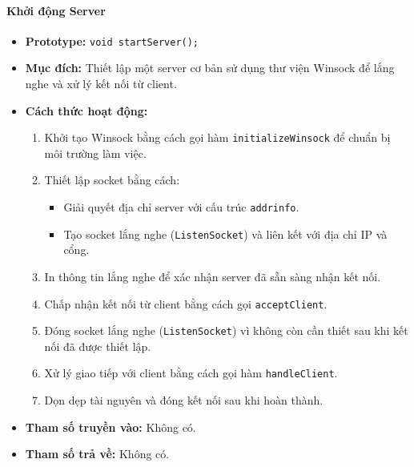 \paragraph{\textbf{Khởi động Server}}
\begin{itemize}
    \item \textbf{Prototype:} \texttt{void startServer();}
    
    \item \textbf{Mục đích:} Thiết lập một server cơ bản sử dụng thư viện Winsock để lắng nghe và xử lý kết nối từ client.
    
    \item \textbf{Cách thức hoạt động:} 
    \begin{enumerate}
        \item Khởi tạo Winsock bằng cách gọi hàm \texttt{initializeWinsock} để chuẩn bị môi trường làm việc.
        \item Thiết lập socket bằng cách:
        \begin{itemize}
            \item Giải quyết địa chỉ server với cấu trúc \texttt{addrinfo}.
            \item Tạo socket lắng nghe (\texttt{ListenSocket}) và liên kết với địa chỉ IP và cổng.
        \end{itemize}
        \item In thông tin lắng nghe để xác nhận server đã sẵn sàng nhận kết nối.
        \item Chấp nhận kết nối từ client bằng cách gọi \texttt{acceptClient}.
        \item Đóng socket lắng nghe (\texttt{ListenSocket}) vì không còn cần thiết sau khi kết nối đã được thiết lập.
        \item Xử lý giao tiếp với client bằng cách gọi hàm \texttt{handleClient}.
        \item Dọn dẹp tài nguyên và đóng kết nối sau khi hoàn thành.
    \end{enumerate}
    
    \item \textbf{Tham số truyền vào:} Không có.
    
    \item \textbf{Tham số trả về:} Không có.
\end{itemize}

